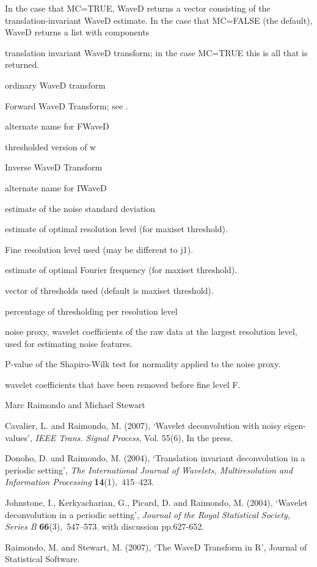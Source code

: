 \documentclass{article}
\begin{document}
\begin{Value}
In the case that MC=TRUE, WaveD returns a vector consisting of the translation-invariant WaveD estimate.
In the case that MC=FALSE (the default), WaveD returns a list with components
\begin{ldescription}
\item[\code{waved}] translation invariant WaveD transform; in the case MC=TRUE this is all that is returned.
\item[\code{ordinary}] ordinary WaveD transform
\item[\code{FWaveD}] Forward WaveD Transform; see .
\item[\code{w}] alternate name for FWaveD
\item[\code{w.thr}] thresholded version of w
\item[\code{IWaveD}] Inverse WaveD Transform
\item[\code{iw}] alternate name for IWaveD
\item[\code{s}] estimate of the noise standard deviation
\item[\code{j1}] estimate of optimal resolution level (for maxiset threshold).
\item[\code{F}] Fine resolution level used (may be different to j1).
\item[\code{M}] estimate of optimal Fourier frequency (for maxiset threshold).
\item[\code{thr}] vector of thresholds used (default is maxiset threshold).
\item[\code{percent}] percentage of thresholding per resolution level
\item[\code{noise}] noise proxy, wavelet coefficients of the raw data at the largest resolution level, used for estimating noise features.
\item[\code{ps}] P-value of the Shapiro-Wilk test for normality applied to the noise proxy.
\item[\code{residuals}] wavelet coefficients that have been removed before fine level F.
\end{ldescription}
\end{Value}
\begin{Author}\relax
Marc Raimondo and Michael Stewart
\end{Author}
\begin{References}\relax
Cavalier, L. and Raimondo, M.  (2007), `Wavelet deconvolution with noisy eigen-values', {\em IEEE Trans. Signal
Process}, Vol. 55(6), In the press.

Donoho, D. and Raimondo, M.  (2004),
`Translation invariant deconvolution in a periodic setting', {\em The
International Journal of Wavelets, Multiresolution and Information
Processing} {\bf 14}(1),~415--423.

Johnstone, I., Kerkyacharian, G., Picard, D. and Raimondo, M.  (2004), 
`Wavelet deconvolution in a periodic
setting', {\em Journal of the Royal Statistical Society, Series B} {\bf
66}(3),~547--573.  with discussion pp.627-652.

Raimondo, M. and Stewart, M. (2007),
`The WaveD Transform in R', Journal of Statistical Software.
\end{References}
\end{document}
